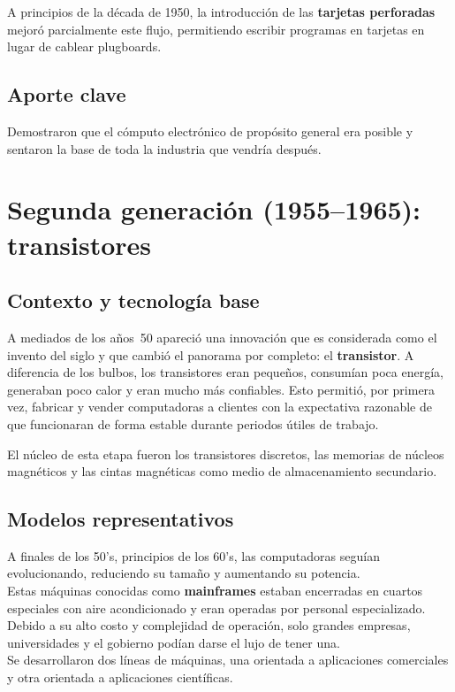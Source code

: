 \documentclass[10pt,letterpaper,twocolumn]{article}
\begin{document}
A principios de la década de 1950, la introducción de las
\textbf{tarjetas perforadas} mejoró parcialmente este flujo, permitiendo
escribir programas en tarjetas en lugar de cablear plugboards.

\subsection{Aporte clave}

Demostraron que el cómputo electrónico de propósito general era posible
y sentaron la base de toda la industria que vendría después.

\section{Segunda generación (1955--1965): transistores}

\subsection{Contexto y tecnología base}

A mediados de los años~50 apareció una innovación que es considerada como el 
invento del siglo y que cambió el panorama por completo: el \textbf{transistor}.
A diferencia de los bulbos, los transistores eran pequeños, 
consumían poca energía, generaban poco calor y eran mucho más confiables. 
Esto permitió, por primera vez, fabricar y vender computadoras a clientes con 
la expectativa razonable de que funcionaran de forma estable durante periodos 
útiles de trabajo.

El núcleo de esta etapa fueron los transistores discretos, las memorias de
núcleos magnéticos y las cintas magnéticas como medio de almacenamiento
secundario.

\subsection{Modelos representativos}

A finales de los 50's, principios de los 60's, las computadoras seguían 
evolucionando, reduciendo su tamaño y aumentando su potencia. \\
Estas máquinas conocidas como \textbf{mainframes} estaban encerradas en cuartos 
especiales con aire acondicionado y eran operadas por personal especializado.
Debido a su alto costo y complejidad de operación, solo grandes empresas, 
universidades y el gobierno podían darse el lujo de tener una. \\
Se desarrollaron dos líneas de máquinas, una orientada a aplicaciones 
comerciales y otra orientada a aplicaciones científicas.
\end{document}
